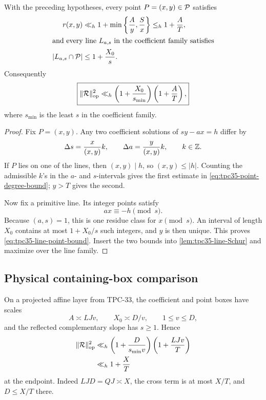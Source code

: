 \begin{theorem}
\label{thm:tpc35-integer-incidence}
With the preceding hypotheses, every point \(P=(x,y)\in\mathcal P\) satisfies
\begin{align}
 r(x,y)
 &\ll_h1+\min\left\{\frac Ay,\frac Sx\right\}
 \le_h1+\frac AT,
 \label{eq:tpc35-point-degree-bound}\\
\intertext{and every line \(L_{a,s}\) in the coefficient family satisfies}
 |L_{a,s}\cap\mathcal P|
 &\le1+\frac{X_0}{s}.
 \label{eq:tpc35-line-point-bound}
\end{align}
Consequently
\begin{equation}
 \boxed{
 \|\mathcal R\|_{\operatorname{op}}^2
 \ll_h\left(1+\frac{X_0}{s_{\min}}\right)
 \left(1+\frac AT\right),}
 \label{eq:tpc35-integer-incidence-bound}
\end{equation}
where \(s_{\min}\) is the least \(s\) in the coefficient family.
\end{theorem}

\begin{proof}
Fix \(P=(x,y)\).  Any two coefficient solutions of
\(sy-ax=h\) differ by
\begin{equation}
 \Delta s=\frac{x}{(x,y)}k,
 \qquad
 \Delta a=\frac{y}{(x,y)}k,
 \qquad k\in\mathbb Z.
 \label{eq:tpc35-coefficient-solution-step}
\end{equation}
If \(P\) lies on one of the lines, then \((x,y)\mid h\), so
\((x,y)\le|h|\).  Counting the admissible \(k\)'s in the \(a\)- and
\(s\)-intervals gives the first estimate in
\eqref{eq:tpc35-point-degree-bound}; \(y>T\) gives the second.

Now fix a primitive line.  Its integer points satisfy
\[
 ax\equiv-h\pmod s.
\]
Because \((a,s)=1\), this is one residue class for \(x\pmod s\).  An
interval of length \(X_0\) contains at most \(1+X_0/s\) such integers,
and \(y\) is then unique.  This proves \eqref{eq:tpc35-line-point-bound}.
Insert the two bounds into \cref{lem:tpc35-line-Schur} and maximize over
the line family.
\end{proof}

\subsection{Physical containing-box comparison}

On a projected affine layer from TPC-33, the coefficient and point boxes
have scales
\begin{equation}
 A\asymp LJv,\qquad X_0\asymp D/v,
 \qquad 1\le v\le D,
 \label{eq:tpc35-physical-box-scales}
\end{equation}
and the reflected complementary slope has \(s\ge1\).  Hence
\begin{align}
 \|\mathcal R\|_{\operatorname{op}}^2
 &\ll_h
 \left(1+\frac{D}{s_{\min}v}\right)
 \left(1+\frac{LJv}{T}\right)
 \notag\\
 &\ll_h1+\frac XT
 \label{eq:tpc35-physical-incidence-scale}
\end{align}
at the endpoint.  Indeed \(LJD=QJ\asymp X\), the cross term is at most
\(X/T\), and \(D\le X/T\) there.

